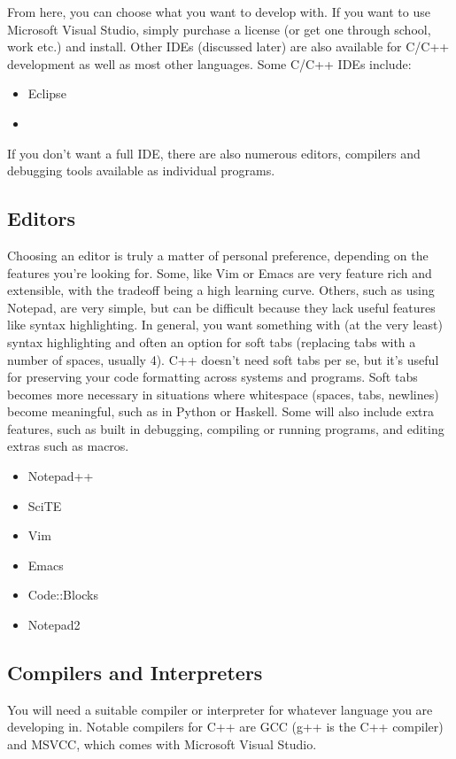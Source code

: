 \documentclass[12pt]{book}
\begin{document}
			From here, you can choose what you want to develop with.  If you want to use Microsoft Visual Studio, simply purchase a license (or get one through school, work etc.) and install.  Other IDEs (discussed later) are also available for C/C++ development as well as most other languages.  Some C/C++ IDEs include: \begin{itemize}
				\item Eclipse
				\item %
			\end{itemize}
			
			If you don't want a full IDE, there are also numerous editors, compilers and debugging tools available as individual programs.
			\subsection{Editors}
				Choosing an editor is truly a matter of personal preference, depending on the features you're looking for.  Some, like Vim or Emacs are very feature rich and extensible, with the tradeoff being a high learning curve.  Others, such as using Notepad, are very simple, but can be difficult because they lack useful features like syntax highlighting.  In general, you want something with (at the very least) syntax highlighting and often an option for soft tabs (replacing tabs with a number of spaces, usually 4).  C++ doesn't need soft tabs per se, but it's useful for preserving your code formatting across systems and programs.  Soft tabs becomes more necessary in situations where whitespace (spaces, tabs, newlines) become meaningful, such as in Python or Haskell.  Some will also include extra features, such as built in debugging, compiling or running programs, and editing extras such as macros.
				\begin{itemize}
					\item Notepad++
					\item SciTE
					\item Vim
					\item Emacs
					\item Code::Blocks
					\item Notepad2
				\end{itemize}
			\subsection{Compilers and Interpreters}
				You will need a suitable compiler or interpreter for whatever language you are developing in.  Notable compilers for C++ are GCC (g++ is the C++ compiler) and MSVCC, which comes with Microsoft Visual Studio.
				
\end{document}

